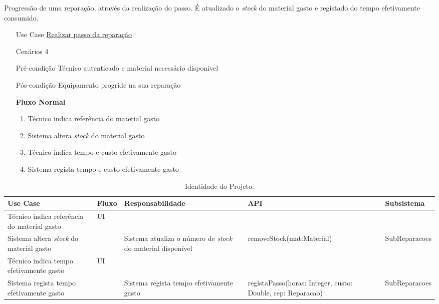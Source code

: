 \documentclass[../relatorio.tex]{subfiles}
\begin{document}
Progressão de uma reparação, através da realização do passo.
É atualizado o \textit{stock} do material gasto e registado do tempo efetivamente consumido.
\begin{itemize}
    \item[Use Case] {\underline{Realizar passo da reparação}}
    \item[Cenários] {4}
    \item[Pré-condição] {Técnico autenticado e material necessário disponível}
    \item[Pós-condição] {Equipamento progride na sua reparação}
          \begin{flushleft}
              \textbf{Fluxo Normal}
          \end{flushleft}
          \begin{enumerate}
              \item Técnico indica referência do material gasto
              \item Sistema altera \textit{stock} do material gasto
              \item Técnico indica tempo e custo efetivamente gasto 
              \item Sistema regista tempo e custo efetivamente gasto
          \end{enumerate}
\end{itemize}

\begin{landscape}
    \begin{table}[!h]
        \centering
        \begin{tabular}{|p{5cm}|p{1cm}|p{4cm}|p{6cm}|p{3cm}|}
            \hline
            \rowcolor{gray!20!white}
            Use Case & Fluxo & Responsabilidade & API & Subsistema \\
            \hline
            \rowcolor{yellow}
            Técnico indica referência do material gasto
                     & UI
                     &
                     &
                     &
            \\
            \hline
            Sistema altera \textit{stock} do material gasto
                     & 
                     & Sistema atualiza o número de \textit{stock} do material disponível
                     & removeStock(mat:Material)
                     & SubReparacoes
            \\
            \hline
            \rowcolor{yellow}
            Técnico indica tempo efetivamente gasto
                     & UI
                     &
                     &
                     &
            \\
            \hline
            Sistema regista tempo efetivamente gasto
                     &
                     & Sistema regista tempo efetivamente gasto
                     & registaPasso(horas: Integer, custo: Double, rep: Reparacao)
                     & SubReparacoes
            \\
            \hline
        \end{tabular}
        \caption{Identidade do Projeto.}
    \end{table}
\end{landscape}
\end{document}
